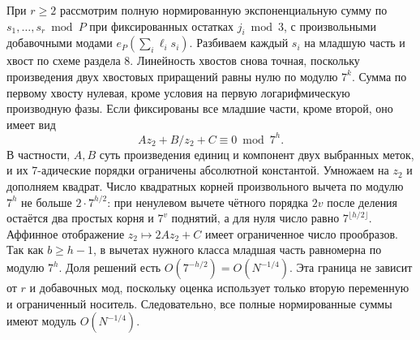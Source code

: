 \documentclass[11pt,a4paper]{article}
\begin{document}
При $r\ge2$ рассмотрим полную нормированную экспоненциальную сумму по $s_1,\ldots,s_r\bmod P$ при фиксированных остатках $j_i\bmod3$, с произвольными добавочными модами $e_P(\sum_i \ell_i s_i)$. Разбиваем каждый $s_i$ на младшую часть и хвост по схеме раздела 8. Линейность хвостов снова точная, поскольку произведения двух хвостовых приращений равны нулю по модулю $7^k$. Сумма по первому хвосту нулевая, кроме условия на первую логарифмическую производную фазы. Если фиксированы все младшие части, кроме второй, оно имеет вид
\[
                 A z_2+B/z_2+C\equiv0\bmod 7^h.
\]
В частности, $A,B$ суть произведения единиц и компонент двух выбранных меток, и их 7-адические порядки ограничены абсолютной константой. Умножаем на $z_2$ и дополняем квадрат. Число квадратных корней произвольного вычета по модулю $7^h$ не больше $2\cdot7^{h/2}$: при ненулевом вычете чётного порядка $2v$ после деления остаётся два простых корня и $7^v$ поднятий, а для нуля число равно $7^{\lfloor h/2\rfloor}$. Аффинное отображение $z_2\mapsto2A z_2+C$ имеет ограниченное число прообразов. Так как $b\ge h-1$, в вычетах нужного класса младшая часть равномерна по модулю $7^h$. Доля решений есть $O(7^{-h/2})=O(N^{-1/4})$. Эта граница не зависит от $r$ и добавочных мод, поскольку оценка использует только вторую переменную и ограниченный носитель. Следовательно, все полные нормированные суммы имеют модуль $O(N^{-1/4})$.
\end{document}
